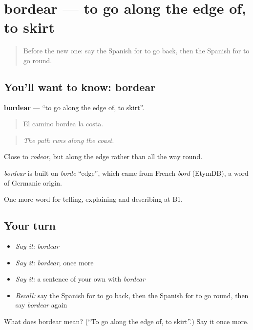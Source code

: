 \section[bordear]{bordear — to go along the edge of, to skirt}

\label{lesson:ES-C673-bordear}



\begin{quote}
Before the new one: say the Spanish for to go back, then the Spanish for to go round.
\end{quote}

\subsection*{You'll want to know: bordear}
\textbf{bordear} — \textquotedblleft{}to go along the edge of, to skirt\textquotedblright{}.

\begin{quote}
El camino bordea la costa.
\end{quote}

\begin{quote}
\emph{The path runs along the coast.}
\end{quote}

Close to \emph{rodear}, but along the edge rather than all the way round.

\begin{cousinweb}
\emph{bordear} is built on \emph{borde} \textquotedblleft{}edge\textquotedblright{}, which came from French \emph{bord} (EtymDB), a word of Germanic origin.
\end{cousinweb}

\begin{grammarlens}[title={What you've built}]
One more word for telling, explaining and describing at B1.
\end{grammarlens}

\subsection*{Your turn}
\begin{itemize}
\raggedright
  \item \emph{Say it:} \emph{bordear}
  \item \emph{Say it:} \emph{bordear}, once more
  \item \emph{Say it:} a sentence of your own with \emph{bordear}
  \item \emph{Recall:} say the Spanish for to go back, then the Spanish for to go round, then say \emph{bordear} again
\end{itemize}

\begin{tcolorbox}[breakable,colback=teal!4,colframe=teal!35!black,title={Before you move on}]
What does bordear mean? (\textquotedblleft{}To go along the edge of, to skirt\textquotedblright{}.) Say it once more.
\end{tcolorbox}

